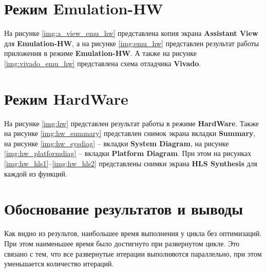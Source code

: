 \section{Режим Emulation-HW}

На рисунке \ref{img:a_view_emu_hw} представлена копия экрана \textbf{Assistant View} для \textbf{Emulation-HW}, а на рисунке \ref{img:emu_hw} представлен результат работы приложения в режиме \textbf{Emulation-HW}. А также на рисунке \ref{img:vivado_emu_hw} представлена схема отладчика \textbf{Vivado}.



\section{Режим HardWare}

На рисунке \ref{img:hw} представлен результат работы в режиме \textbf{HardWare}. Также на рисунке \ref{img:hw_summary} представлен снимок экрана вкладки \textbf{Summary}, на рисунке \ref{img:hw_sysdiag} -- вкладки \textbf{System Diagram}, на рисунке \ref{img:hw_platformdiag} -- вкладки \textbf{Platform Diagram}. При этом на рисунках \ref{img:hw_hls1}--\ref{img:hw_hls2} представлены снимки экрана \textbf{HLS Synthesis} для каждой из функций.

\clearpage




\clearpage


\section{Обоснование результатов и выводы}

Как видно из результов, наибольшее время выполнения у цикла без оптимизаций. При этом наименьшее время было достигнуто при развернутом цикле. Это связано с тем, что все развернутые итерации выполняются параллельно, при этом уменьшается количество итераций.




